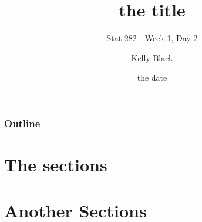 

\title{the title}
\subtitle{Stat 282 - Week 1, Day 2}

\author{Kelly Black}
\date{the date}

\begin{frame}
  \titlepage
\end{frame}

\begin{frame}
  \frametitle{Outline}
\end{frame}


\section{The sections}


\begin{frame}
  \frametitle{}


\end{frame}




\section{Another Sections}

\begin{frame}
  \frametitle{}



\end{frame}


\begin{frame}
  \frametitle{}

  \begin{definition}
    
  \end{definition}

\end{frame}


